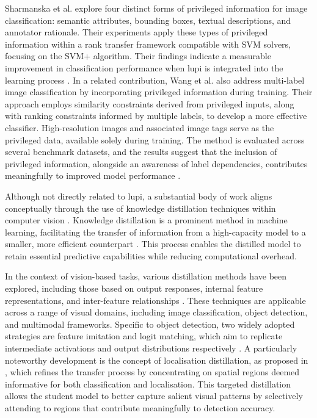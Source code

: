 Sharmanska et al. \cite{learning2rank, learning2rank2} explore four distinct forms of privileged information for image classification: semantic attributes, bounding boxes, textual descriptions, and annotator rationale. Their experiments apply these types of privileged information within a rank transfer framework compatible with SVM solvers, focusing on the SVM+ algorithm. Their findings indicate a measurable improvement in classification performance when \gls{lupi} is integrated into the learning process \cite{learning2rank, learning2rank2}.
In a related contribution, Wang et al. \cite{lupi_classification} also address multi-label image classification by incorporating privileged information during training. Their approach employs similarity constraints derived from privileged inputs, along with ranking constraints informed by multiple labels, to develop a more effective classifier. High-resolution images and associated image tags serve as the privileged data, available solely during training. The method is evaluated across several benchmark datasets, and the results suggest that the inclusion of privileged information, alongside an awareness of label dependencies, contributes meaningfully to improved model performance \cite{lupi_classification}.

Although not directly related to \gls{lupi}, a substantial body of work aligns conceptually through the use of knowledge distillation techniques within computer vision \cite{distillation1, distillation2}. Knowledge distillation is a prominent method in machine learning, facilitating the transfer of information from a high-capacity model to a smaller, more efficient counterpart \cite{hinton_distillation}. This process enables the distilled model to retain essential predictive capabilities while reducing computational overhead.

In the context of vision-based tasks, various distillation methods have been explored, including those based on output responses, internal feature representations, and inter-feature relationships \cite{distillation1}. These techniques are applicable across a range of visual domains, including image classification, object detection, and multimodal frameworks. Specific to object detection, two widely adopted strategies are feature imitation and logit matching, which aim to replicate intermediate activations and output distributions respectively \cite{distillation2}.
A particularly noteworthy development is the concept of localisation distillation, as proposed in \cite{distillation2}, which refines the transfer process by concentrating on spatial regions deemed informative for both classification and localisation. This targeted distillation allows the student model to better capture salient visual patterns by selectively attending to regions that contribute meaningfully to detection accuracy.

